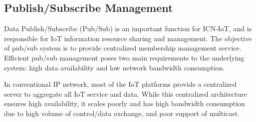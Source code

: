 

\subsection{Publish/Subscribe Management}
Data Publish/Subscribe (Pub/Sub) is an important function for ICN-IoT, and is responsible for IoT information resource sharing and management. The objective of pub/sub system is to provide centralized membership management service. Efficient pub/sub management poses two main requirements to the underlying system: high data availability and low network bandwidth consumption.

In conventional IP network, most of the IoT platforms provide a centralized server to aggregate all IoT service and data. While this centralized architecture ensures high availability, it scales poorly and has high bandwidth consumption due to high volume of control/data exchange, and poor support of multicast.

